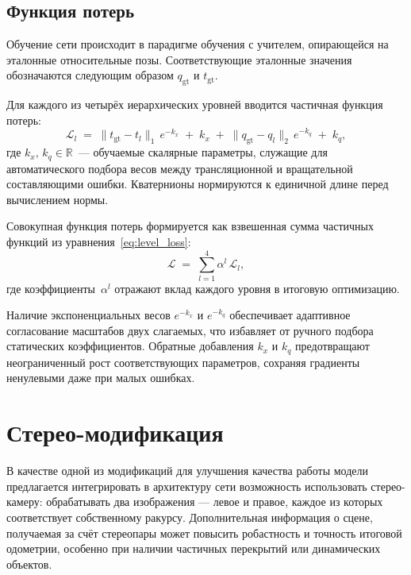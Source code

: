 \subsection{Функция потерь}
\label{sec:loss_function}

Обучение сети происходит в парадигме обучения с учителем,
опирающейся на эталонные относительные позы.
Соответствующие эталонные значения обозначаются следующим образом
${q}_{\mathrm{gt}}$ и ${t}_{\mathrm{gt}}$.

Для каждого из четырёх иерархических уровней вводится частичная
функция потерь:
\begin{equation}
\label{eq:level_loss}
\mathcal{L}_{l} \;=\;
\bigl\lVert {t}_{\mathrm{gt}} - {t}_{l} \bigr\rVert_{1}\,
e^{-k_{x}}
\;+\;
k_{x}
\;+\;
\bigl\lVert {q}_{\mathrm{gt}} - {q}_{l} \bigr\rVert_{2}\,
e^{-k_{q}}
\;+\;
k_{q},
\end{equation}
где 
$k_{x},\,k_{q}\in\mathbb{R}$ — обучаемые скалярные параметры,
служащие для автоматического подбора весов между
трансляционной и вращательной составляющими ошибки.
Кватернионы нормируются к единичной длине перед
вычислением нормы.

Совокупная функция потерь формируется как взвешенная сумма частичных функций из уравнения~\eqref{eq:level_loss}:
\begin{equation*}
\label{eq:total_loss}
\mathcal{L} \;=\;
\sum_{l=1}^{4} \alpha^{l}\,\mathcal{L}_{l},
\end{equation*}
где коэффициенты $\alpha^{l}$ отражают вклад
каждого уровня в итоговую оптимизацию.

Наличие экспоненциальных весов $e^{-k_{x}}$ и
$e^{-k_{q}}$ обеспечивает адаптивное согласование
масштабов двух слагаемых, что избавляет от ручного
подбора статических коэффициентов. Обратные
добавления $k_{x}$ и $k_{q}$ предотвращают неограниченный
рост соответствующих параметров, сохраняя градиенты
ненулевыми даже при малых ошибках.

\section{Стерео-модификация}
\label{sec:stereo_camera}

В качестве одной из модификаций для улучшения качества работы модели 
предлагается интегрировать в архитектуру сети возможность использовать 
стерео-камеру: обрабатывать два изображения --- левое и правое, 
каждое из которых соответствует собственному ракурсу. 
Дополнительная информация о сцене, получаемая за счёт стереопары 
может повысить робастность и точность итоговой одометрии, 
особенно при наличии частичных перекрытий или динамических объектов.

